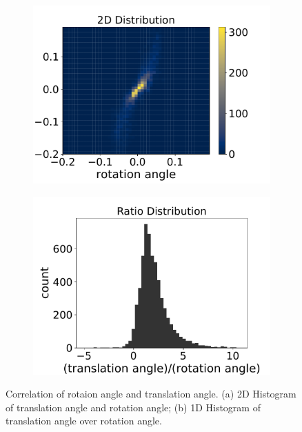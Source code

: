 \begin{figure}[h]
    \centering
    \begin{subfigure}[b]{0.225\textwidth}
        \centering
        \includegraphics[width=\textwidth]{datavo/r_t_2d_hist.pdf}
        \caption{}
        \label{fig:rt_2d} 
    \end{subfigure}
    \begin{subfigure}[b]{0.225\textwidth}
        \centering
        \includegraphics[width=\textwidth]{datavo/r_t_1d_hist.pdf}
        \caption{}
        \label{fig:rt_1d}
    \end{subfigure}
    \caption{Correlation of rotaion angle and translation angle. (a) 2D Histogram of translation angle and rotation angle; (b) 1D Histogram  of translation angle over rotation angle.}
    \label{fig:rotation_corr_analysis}
\end{figure}

